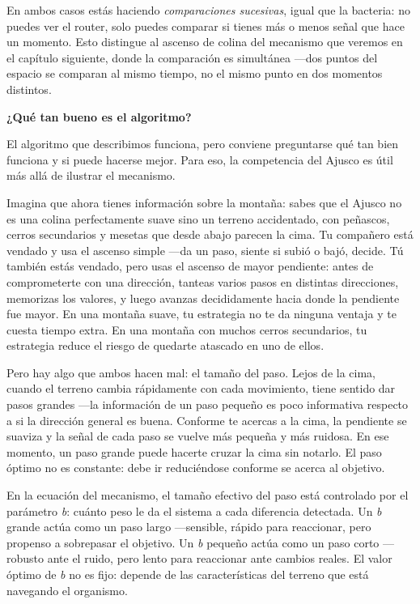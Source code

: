 \documentclass[
  letterpaper,
  DIV=11,
  numbers=noendperiod]{scrreprt}
\begin{document}
En ambos casos estás haciendo \emph{comparaciones sucesivas}, igual que
la bacteria: no puedes ver el router, solo puedes comparar si tienes más
o menos señal que hace un momento. Esto distingue al ascenso de colina
del mecanismo que veremos en el capítulo siguiente, donde la comparación
es simultánea ---dos puntos del espacio se comparan al mismo tiempo, no
el mismo punto en dos momentos distintos.

\textbf{¿Qué tan bueno es el algoritmo?}

El algoritmo que describimos funciona, pero conviene preguntarse qué tan
bien funciona y si puede hacerse mejor. Para eso, la competencia del
Ajusco es útil más allá de ilustrar el mecanismo.

Imagina que ahora tienes información sobre la montaña: sabes que el
Ajusco no es una colina perfectamente suave sino un terreno accidentado,
con peñascos, cerros secundarios y mesetas que desde abajo parecen la
cima. Tu compañero está vendado y usa el ascenso simple ---da un paso,
siente si subió o bajó, decide. Tú también estás vendado, pero usas el
ascenso de mayor pendiente: antes de comprometerte con una dirección,
tanteas varios pasos en distintas direcciones, memorizas los valores, y
luego avanzas decididamente hacia donde la pendiente fue mayor. En una
montaña suave, tu estrategia no te da ninguna ventaja y te cuesta tiempo
extra. En una montaña con muchos cerros secundarios, tu estrategia
reduce el riesgo de quedarte atascado en uno de ellos.

Pero hay algo que ambos hacen mal: el tamaño del paso. Lejos de la cima,
cuando el terreno cambia rápidamente con cada movimiento, tiene sentido
dar pasos grandes ---la información de un paso pequeño es poco
informativa respecto a si la dirección general es buena. Conforme te
acercas a la cima, la pendiente se suaviza y la señal de cada paso se
vuelve más pequeña y más ruidosa. En ese momento, un paso grande puede
hacerte cruzar la cima sin notarlo. El paso óptimo no es constante: debe
ir reduciéndose conforme se acerca al objetivo.

En la ecuación del mecanismo, el tamaño efectivo del paso está
controlado por el parámetro \emph{b}: cuánto peso le da el sistema a
cada diferencia detectada. Un \emph{b} grande actúa como un paso largo
---sensible, rápido para reaccionar, pero propenso a sobrepasar el
objetivo. Un \emph{b} pequeño actúa como un paso corto ---robusto ante
el ruido, pero lento para reaccionar ante cambios reales. El valor
óptimo de \emph{b} no es fijo: depende de las características del
terreno que está navegando el organismo.
\end{document}
